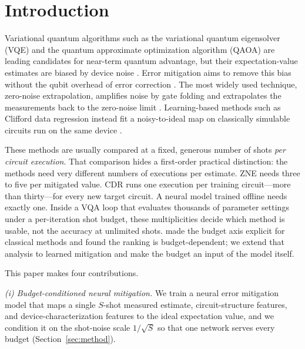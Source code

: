 \documentclass[11pt]{article}
\begin{document}
\begin{abstract}
\medskip
\noindent\textbf{Keywords:} quantum error mitigation, variational quantum algorithms, neural networks, NISQ, zero-noise extrapolation, Clifford data regression
\end{abstract}

\section{Introduction}
\label{sec:intro}

Variational quantum algorithms such as the variational quantum eigensolver (VQE) and the quantum approximate optimization algorithm (QAOA) are leading candidates for near-term quantum advantage, but their expectation-value estimates are biased by device noise \citep{preskill2018quantum,cerezo2021variational,bharti2022noisy,tilly2022variational}. Error mitigation aims to remove this bias without the qubit overhead of error correction \citep{temme2017error,cai2023quantum}. The most widely used technique, zero-noise extrapolation, amplifies noise by gate folding and extrapolates the measurements back to the zero-noise limit \citep{temme2017error,li2017efficient,giurgicatiron2020digital,kim2023evidence}. Learning-based methods such as Clifford data regression instead fit a noisy-to-ideal map on classically simulable circuits run on the same device \citep{czarnik2021error,strikis2021learning}.

These methods are usually compared at a fixed, generous number of shots \emph{per circuit execution}. That comparison hides a first-order practical distinction: the methods need very different numbers of executions per estimate. ZNE needs three to five per mitigated value. CDR runs one execution per training circuit---more than thirty---for every new target circuit. A neural model trained offline needs exactly one. Inside a VQA loop that evaluates thousands of parameter settings under a per-iteration shot budget, these multiplicities decide which method is usable, not the accuracy at unlimited shots. \citet{bultrini2023unifying} made the budget axis explicit for classical methods and found the ranking is budget-dependent; we extend that analysis to learned mitigation and make the budget an input of the model itself.

This paper makes four contributions.

\emph{(i) Budget-conditioned neural mitigation.} We train a neural error mitigation model that maps a single $S$-shot measured estimate, circuit-structure features, and device-characterization features to the ideal expectation value, and we condition it on the shot-noise scale $1/\sqrt{S}$ so that one network serves every budget (Section~\ref{sec:method}).
\end{document}
